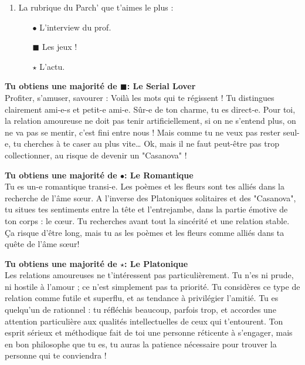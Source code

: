 {\begin{multicols}{3}
\begin{enumerate}[leftmargin=0cm,itemindent=.5cm, itemsep=0mm]
	\item La rubrique du Parch' que t'aimes le plus :
	\begin{itemize}[itemindent=.3cm, topsep=-4pt]
	\setlength\itemsep{-2mm}
		\item[$\bullet$]L'interview du prof.
		\item[\tiny{$\blacksquare$}]Les jeux !
		\item[$\star$]L'actu.
	\end{itemize}
\end{enumerate}

\columnbreak
\textbf{Tu obtiens une majorité de {\tiny{$\blacksquare$}}: Le Serial Lover}\\
Profiter, s'amuser, savourer : Voilà les mots qui te régissent ! Tu distingues clairement ami-e-s et petit-e ami-e. Sûr-e de ton charme, tu es direct-e. Pour toi, la relation amoureuse ne doit pas tenir artificiellement, si on ne s'entend plus, on ne va pas se mentir, c'est fini entre nous ! Mais comme tu ne veux pas rester seul-e, tu cherches à te caser au plus vite… Ok, mais il ne faut peut-être pas trop collectionner, au risque de devenir un "Casanova" ! 

\textbf{Tu obtiens une majorité de $\bullet$: Le Romantique}\\
Tu es un-e romantique transi-e. Les poèmes et les fleurs sont tes alliés dans la recherche de l'âme sœur. A l'inverse des Platoniques solitaires et des "Casanova", tu situes tes sentiments entre la tête et l'entrejambe, dans la partie émotive de ton corps : le cœur. Tu recherches avant tout la sincérité et une relation stable. Ça risque d'être long, mais tu as les poèmes et les fleurs comme alliés dans ta quête de l'âme sœur!

\textbf{Tu obtiens une majorité de $\star$: Le Platonique}\\
Les relations amoureuses ne t'intéressent pas particulièrement. Tu n’es ni prude, ni hostile à l’amour ; ce n’est simplement pas ta priorité. Tu considères ce type de relation comme futile et superflu, et as tendance à privilégier l’amitié. Tu es quelqu’un de rationnel : tu réfléchis beaucoup, parfois trop, et accordes une attention particulière aux qualités intellectuelles de ceux qui t'entourent. Ton esprit sérieux et méthodique fait de toi une personne réticente à s’engager, mais en bon philosophe que tu es, tu auras la patience nécessaire pour trouver la personne qui te conviendra !
\end{multicols}}




